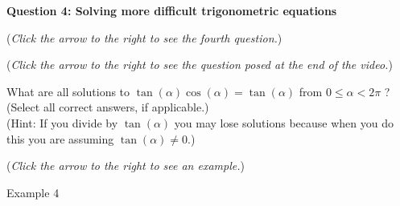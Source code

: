 \documentclass{ximera}
\begin{document}
\textbf{Question 4: Solving more difficult trigonometric equations}
\begin{question}
\begin{flushright}
{\color{blue}(\emph{Click the arrow to the right to see the fourth question.})}
\end{flushright}
\begin{center}
\begin{expandable}
\begin{flushright}
{\color{blue}(\emph{Click the arrow to the right to see the question
posed at the end of the video.})}
\end{flushright}
\begin{expandable}
What are all solutions to 
$\tan(\alpha)\cos(\alpha) = \tan(\alpha)$ from $0\leq \alpha <2\pi$
? \\ (Select all correct answers, if applicable.) \\
(Hint: If you divide by $\tan(\alpha)$ you may lose solutions because when you do this you are assuming $\tan(\alpha) \neq 0$.)
\begin{selectAll}
\choice[correct]{$\pi$}
\end{selectAll}
\begin{flushright}
{\color{blue}(\emph{Click the arrow to the right to see an example.})}
\end{flushright}
\begin{expandable}
\begin{center}
Example 4
\end{center}
\end{expandable}
\end{expandable}
\end{expandable}
\end{center}
\end{question}
\end{document}
